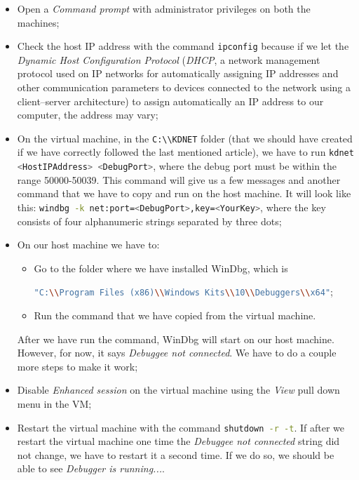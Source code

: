 \begin{itemize}
	\item 
		Open a \textit{Command prompt} with administrator privileges on both the machines;
	\item 
		Check the host IP address with the command \colorbox{backcolour}{\lstinline[style=commandline, language=bash, breaklines=true]|ipconfig|} because if we let the \textit{Dynamic Host Configuration Protocol} (\textit{DHCP}, a network management protocol used on IP networks for automatically assigning IP addresses and other communication parameters to devices connected to the network using a client–server architecture) to assign automatically an IP address to our computer, the address may vary;
	\item 
		On the virtual machine, in the \colorbox{backcolour}{\lstinline[style=commandline, language=bash, breaklines=true]|C:\\KDNET|} folder (that we should have created if we have correctly followed the last mentioned article), we have to run \colorbox{backcolour}{\lstinline[style=commandline, language=bash, breaklines=true]|kdnet <HostIPAddress> <DebugPort>|}, where the debug port must be within the range 50000-50039.
		This command will give us a few messages and another command that we have to copy and run on the host machine.
		It will look like this: \colorbox{backcolour}{\lstinline[style=commandline, language=bash, breaklines=true]|windbg -k net:port=<DebugPort>,key=<YourKey>|}, where the key consists of four alphanumeric strings separated by three dots;
	\item 
		On our host machine we have to:
		\begin{itemize}
			\item 
				Go to the folder where we have installed WinDbg, which is 
				
				\noindent
				\colorbox{backcolour}{\lstinline[style=commandline, language=bash, breaklines=true]|"C:\\Program Files (x86)\\Windows Kits\\10\\Debuggers\\x64"|};
			\item 
				Run the command that we have copied from the virtual machine.
		\end{itemize}
		After we have run the command, WinDbg will start on our host machine.
		However, for now, it says \textit{Debuggee not connected}.
		We have to do a couple more steps to make it work;
	\item 
		Disable \textit{Enhanced session} on the virtual machine using the \textit{View} pull down menu in the VM;
	\item 
		Restart the virtual machine with the command \colorbox{backcolour}{\lstinline[style=commandline, language=bash, breaklines=true]|shutdown -r -t|}.
		If after we restart the virtual machine one time the \textit{Debuggee not connected} string did not change, we have to restart it a second time.
		If we do so, we should be able to see \textit{Debugger is running...}.
\end{itemize}

